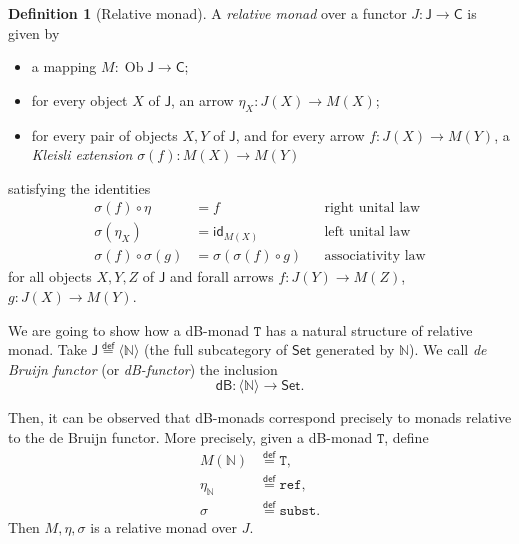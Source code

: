 \documentclass[a4paper,twoside,12pt]{article}
\theoremstyle{definition}
\newtheorem{definition}{Definition}
\theoremstyle{remark}
\theoremstyle{example}
\DeclareMathOperator{\Ob}{Ob}
\newcommand{\NN}{\mathbb{N}}
\newcommand{\TT}{\mathtt{T}}
\newcommand{\subst}{\mathtt{subst}}
\newcommand{\refe}{\mathtt{ref}}
\begin{document}
\begin{definition}[Relative monad]
  A \emph{relative monad} over a functor
  $J\colon \mathsf{J}\to \mathsf{C}$ is given by
  \begin{itemize}
  \item a mapping $M:\Ob \mathsf{J} \to \mathsf{C}$;
  \item for every object $X$ of $\mathsf{J}$, an arrow $\eta_X\colon
    J(X) \to M(X)$;
  \item for every pair of objects $X,Y$ of $\mathsf{J}$, and for every
    arrow $f\colon J(X) \to M(Y)$, a \emph{Kleisli extension}
    $\sigma(f) \colon M(X) \to M(Y)$
  \end{itemize}
  satisfying the identities
  \begin{align*}
    \sigma(f) \circ \eta &= f &&\text{right unital law} \\
    \sigma(\eta_X) &= \mathsf{id}_{M(X)} &&\text{left unital law} \\
    \sigma(f) \circ \sigma(g) &= \sigma(\sigma(f) \circ g) &&\text{associativity law}
  \end{align*}
  for all objects $X,Y,Z$ of $\mathsf{J}$ and forall arrows
  $f\colon J(Y)\to M(Z)$, $g\colon J(X)\to M(Y)$.
\end{definition}

We are going to show how a dB-monad $\TT$ has a natural structure of
relative monad.  Take
$\mathsf{J} \stackrel{\mathsf{def}}{=}\langle \NN \rangle$ (the full
subcategory of $\mathsf{Set}$ generated by $\NN$).  We call \emph{de
  Bruijn functor} (or \emph{dB-functor}) the inclusion
\begin{equation}
  \label{eq:dB-functor}
  \mathsf{dB}\colon \langle \NN \rangle \to \mathsf{Set}.
\end{equation}

Then, it can be observed that dB-monads correspond precisely to monads
relative to the de Bruijn functor.  More precisely, given a dB-monad
$\TT$, define
\begin{align*}
  M(\NN) &\stackrel{\mathsf{def}}{=} \TT, \\
  \eta_\NN &\stackrel{\mathsf{def}}{=} \refe, \\
  \sigma &\stackrel{\mathsf{def}}{=} \subst.
\end{align*}
Then $M,\eta,\sigma$ is a relative monad over $J$.

\end{document}
